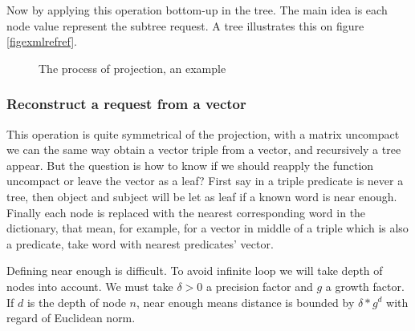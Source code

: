 Now by applying this operation bottom-up in the tree. The main idea is each node value represent the subtree request. A tree illustrates this on figure \ref{figexmlrefref}.

\FloatBarrier

\begin{figure}
\centering
{}
\caption{The process of projection, an example}
\label{figexmlrefcomp}
\end{figure}

\FloatBarrier

\subsubsection{Reconstruct a request from a vector}

This operation is quite symmetrical of the projection, with a matrix uncompact we can the same way obtain a vector triple from a vector, and recursively a tree appear. But the question is how to know if we should reapply the function uncompact or leave the vector as a leaf? First say in a triple predicate is never a tree, then object and subject will be let as leaf if a known word is near enough. Finally each node is replaced with the nearest corresponding word in the dictionary, that mean, for example, for a vector in middle of a triple which is also a predicate, take word with nearest predicates' vector.

Defining near enough is difficult. To avoid infinite loop we will take depth of nodes into account. We must take $\delta>0$ a precision factor and $g$ a growth factor. If $d$ is the depth of node $n$, near enough means distance is bounded by $\delta*g^d$ with regard of Euclidean norm.  

